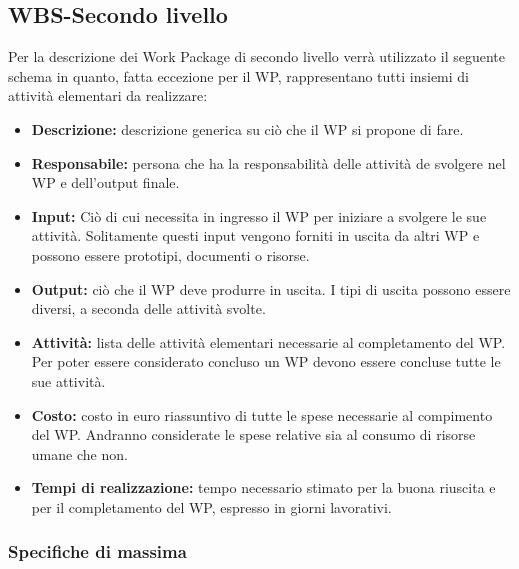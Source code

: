 \subsection {WBS-Secondo livello}

Per la descrizione dei Work Package di secondo livello verrà utilizzato il seguente schema
in quanto, fatta eccezione per il WP, rappresentano tutti insiemi di attività
elementari da realizzare:
\begin{itemize}

\item \textbf{Descrizione:} descrizione generica su ciò che il WP si propone di fare.

\item \textbf{Responsabile:} persona che ha la responsabilità delle attività de svolgere nel WP
e dell’output finale.

\item \textbf{Input:} Ciò di cui necessita in ingresso il WP per iniziare a svolgere le sue attività.
Solitamente questi input vengono forniti in uscita da altri WP e possono essere
prototipi, documenti o risorse.

\item \textbf{Output:} ciò che il WP deve produrre in uscita. I tipi di uscita possono essere
diversi, a seconda delle attività svolte.

\item \textbf{Attività:} lista delle attività elementari necessarie al completamento del WP.
Per poter essere considerato concluso un WP devono essere concluse tutte le sue
attività.

\item \textbf{Costo:} costo in euro riassuntivo di tutte le spese necessarie al compimento del
WP. Andranno considerate le spese relative sia al consumo di risorse umane che
non.

\item \textbf{Tempi di realizzazione:} tempo necessario stimato per la buona riuscita e per il completamento del WP, espresso in giorni lavorativi.
\end{itemize}




\subsubsection{Specifiche di massima}

